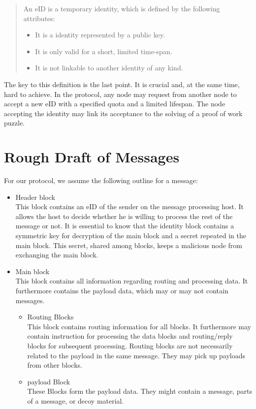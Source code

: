 \begin{quote}
	An eID is a temporary identity, which is defined by the following attributes:
	\begin{itemize}
		\item It is a identity represented by a public key.
		\item It is only valid for a short, limited time-span.
		\item It is not linkable to another identity of any kind.
	\end{itemize}
\end{quote}
The key to this definition is the last point. It is crucial and, at the same time, hard to achieve. In the protocol, any node may request from another node to accept a new eID with a specified quota and a limited lifespan. The node accepting the identity may link its acceptance to the solving of a proof of work puzzle.

\section{Rough Draft of Messages}
For our protocol, we assume the following outline for a message:
\begin{itemize}
	\item Header block\\ 
	This block contains an eID of the sender on the message processing host. It allows the host to decide whether he is willing to process the rest of the message or not. It is essential to know that the identity block contains a symmetric key for decryption of the main block and a secret repeated in the main block. This secret, shared among blocks, keeps a malicious node from exchanging the main block.
	\item Main block\\
	This block contains all information regarding routing and processing data. It furthermore contains the payload data, which may or may not contain messages.
	\begin{itemize}
		\item Routing Blocks\\
		This block contains routing information for all blocks. It furthermore may contain instruction for processing the data blocks and routing/reply blocks for subsequent processing. Routing blocks are not necessarily related to the payload in the same message. They may pick up payloads from other blocks.
		\item payload Block\\
		These Blocks form the payload data. They might contain a message, parts of a message, or decoy material.
	\end{itemize}      
\end{itemize}

